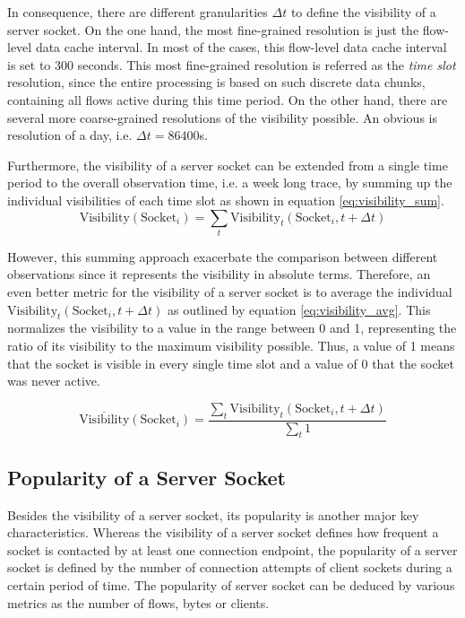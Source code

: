 In consequence, there are different granularities $\Delta{t}$ to define the
visibility of a \gls{server socket}. On the one hand, the most fine-grained
resolution is just the flow-level data cache interval. In most of the cases,
this flow-level data cache interval is set to 300 seconds. This most
fine-grained resolution is referred as the \emph{time slot} resolution, since
the entire processing is based on such discrete data chunks, containing all
flows active during this time period.
On the other hand, there are several more coarse-grained resolutions of the
visibility possible. An obvious is resolution of a day, i.e.
$\Delta{t} = 86400$s.

Furthermore, the visibility of a \gls{server socket} can be extended from a
single time period to the overall observation time, i.e. a week long trace, by
summing up the individual visibilities of each time slot as shown in equation
\ref{eq:visibility_sum}.
\begin{equation}
	\text{Visibility}(\text{Socket}_i) = \sum_{t} \text{Visibility}_t(\text{Socket}_i,t+\Delta{t})
	\label{eq:visibility_sum}
\end{equation}

However, this summing approach exacerbate the comparison between different
observations since it represents the visibility in absolute terms. Therefore, an
even better metric for the visibility of a \gls{server socket} is to average the
individual $\text{Visibility}_t(\text{Socket}_i,t+\Delta{t})$ as outlined by
equation \ref{eq:visibility_avg}. This normalizes the visibility to a value in
the range between 0 and 1, representing the ratio of its visibility to the
maximum visibility possible. Thus, a value of 1 means that the socket is visible
in every single time slot and a value of 0 that the socket was never active.

\begin{equation}
	\overline{\text{Visibility}}(\text{Socket}_i) = \frac{\sum_{t} \text{Visibility}_t(\text{Socket}_i,t+\Delta{t})}{\sum_{t}1}
	\label{eq:visibility_avg}
\end{equation}

\subsection{Popularity of a Server Socket}

Besides the visibility of a \gls{server socket}, its popularity is another major
key characteristics. Whereas the visibility of a \gls{server socket} defines how
frequent a socket is contacted by at least one connection endpoint, the
popularity of a \gls{server socket} is defined by the number of connection
attempts of client sockets during a certain period of time. The popularity of
\gls{server socket} can be deduced by various metrics as the number of flows,
bytes or clients.


